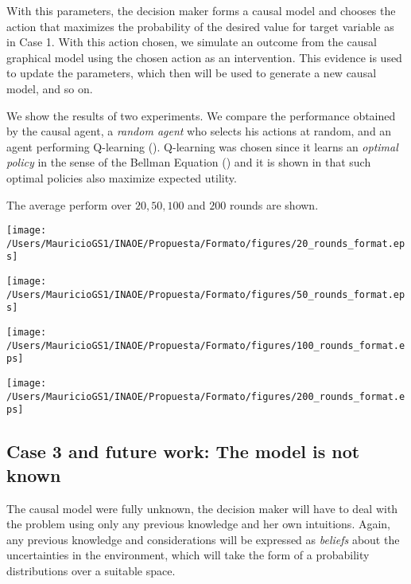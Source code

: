 \documentclass[english,letterpaper,12pt,final]{article}
\theoremstyle{definition}
\begin{document}
With this parameters, the decision maker forms a causal model and chooses the action that maximizes the probability of the desired value for target variable as in Case 1.  With this action chosen, we simulate an outcome from the causal graphical model using the chosen action as an intervention. This evidence is used to update the parameters, which then will be used to generate a new causal model, and so on.

We show the results of two experiments. We compare the performance obtained by the causal agent, a \textit{random agent} who selects his actions at random, and an agent performing Q-learning (\cite{watkins1992q}). Q-learning was chosen since it learns an \textit{optimal policy} in the sense of the Bellman Equation (\cite{sutton1998reinforcement}) and it is shown in \cite{webb2007game} that such optimal policies also maximize expected utility. 

The average perform over $20, 50, 100$ and $200$ rounds are shown.

\begin{center}
\begin{minipage}{0.48\linewidth}
\texttt{[image: /Users/MauricioGS1/INAOE/Propuesta/Formato/figures/20\_rounds\_format.eps]}
\end{minipage}%
\hfill
\begin{minipage}{0.49\linewidth}
\texttt{[image: /Users/MauricioGS1/INAOE/Propuesta/Formato/figures/50\_rounds\_format.eps]}
\end{minipage}
\end{center}
\begin{center}
\begin{minipage}{0.49\linewidth}
\texttt{[image: /Users/MauricioGS1/INAOE/Propuesta/Formato/figures/100\_rounds\_format.eps]}
\end{minipage}
\hfill
\begin{minipage}{0.49\linewidth}
\texttt{[image: /Users/MauricioGS1/INAOE/Propuesta/Formato/figures/200\_rounds\_format.eps]}
\end{minipage}
\end{center}

\subsection{Case 3 and future work: The model is not known}
The causal model were fully unknown, the decision maker will have to deal with the problem using only any previous knowledge and her own intuitions. Again, any previous knowledge and considerations will be expressed as \textit{beliefs} about the uncertainties in the environment, which will take the form of a probability distributions over a suitable space. 
\end{document}
